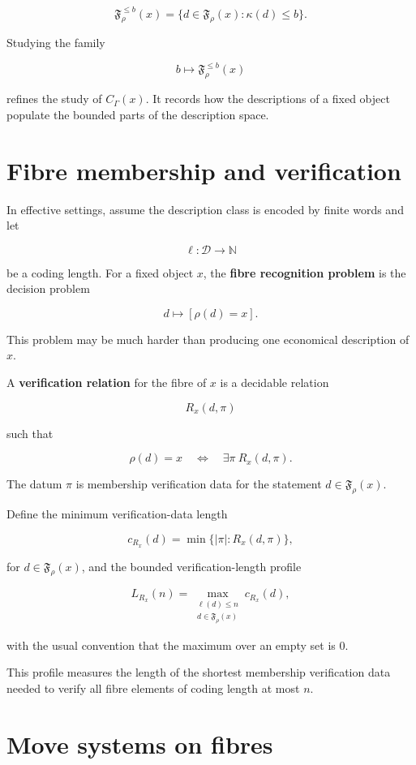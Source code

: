 \documentclass[11pt]{article}
\begin{document}
\[
\mathfrak F_\rho^{\leq b}(x)=\{d\in\mathfrak F_\rho(x):\kappa(d)\leq b\}.
\]

Studying the family

\[
b\mapsto \mathfrak F_\rho^{\leq b}(x)
\]

refines the study of \(C_\Gamma(x)\). It records how the descriptions of a fixed object populate the bounded parts of the description space.


\section{Fibre membership and verification}

In effective settings, assume the description class is encoded by finite words and let

\[
\ell:\mathcal D\to\mathbb N
\]

be a coding length. For a fixed object \(x\), the \textbf{fibre recognition problem} is the decision problem

\[
d\longmapsto [\rho(d)=x].
\]

This problem may be much harder than producing one economical description of \(x\).

A \textbf{verification relation} for the fibre of \(x\) is a decidable relation

\[
R_x(d,\pi)
\]

such that

\[
\rho(d)=x
\quad\Longleftrightarrow\quad
\exists \pi\ R_x(d,\pi).
\]

The datum \(\pi\) is membership verification data for the statement \(d\in\mathfrak F_\rho(x)\).

Define the minimum verification-data length

\[
c_{R_x}(d)=\min\{|\pi|:R_x(d,\pi)\},
\]

for \(d\in\mathfrak F_\rho(x)\), and the bounded verification-length profile

\[
L_{R_x}(n)=
\max_{\substack{\ell(d)\leq n\\ d\in\mathfrak F_\rho(x)}}
c_{R_x}(d),
\]

with the usual convention that the maximum over an empty set is \(0\).

This profile measures the length of the shortest membership verification data needed to verify all fibre elements of coding length at most \(n\).


\section{Move systems on fibres}
\end{document}
